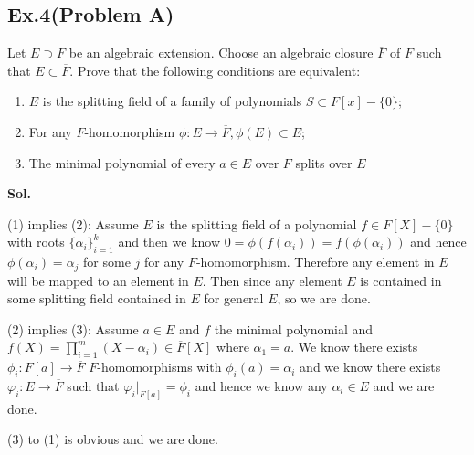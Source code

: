\documentclass[lang=en,11pt,a4paper,citestyle =authoryear]{elegantpaper}
\begin{document}
\subsection*{Ex.4(Problem A)}
Let $E\supset F$ be an algebraic extension. Choose an algebraic closure $\overline{F}$ of $F$ such that $E \subset \overline{F}$. Prove that the following conditions are equivalent:\par
\begin{enumerate}
    \item $E$ is the splitting field of a family of polynomials $S \subset F[x] - \{0\}$;
    \item For any $F$-homomorphism $\phi : E \to \overline{F} , \phi(E) \subset E$;
    \item The minimal polynomial of every $a \in E$ over $F$ splits over $E$ 
\end{enumerate}
\vspace{0.5em}
\textbf{Sol.} \par
\iffalse
1 $\Rightarrow$ 2: If $E$ is the splitting field of a family of polynomials $S\subset F[x]-\{0\}$, then any $\alpha\in E$ is a linear combination of roots of polynomials in $S\subset F[x]-\{0\}$. Therefore, any $F$-homomorphism fixing $F$ doesn't change $S$, which sends roots of polynomials to some roots of the same polynomials. Since $E$ is the splitting field, all these roots are in $E$, hence $\phi(E)\subset E$.

2 $\Rightarrow$ 3: For $a\in E$, the minimal polynomial over $F$, denoted by $m_{a, F}$ is irreducible. Since $a\in E$, we may regard $E$ as an extension of $F(a)$. Since $\phi$ sends $E$ to $E$, we know the conjugates of $a$, i.e. other roots of $m_{a,F}$, are in $E$ as well. Therefore, $m_{a,F}$ splits over $E$.

3 $\Rightarrow$ 1: Since for any $a\in E$, $m_{\alpha, F}$ splits over $F$, we may regard $E$ as the splitting field of $m_{a, F}$ for all $a\in E$.

We are done.
\fi
(1) implies (2): Assume $E$ is the splitting field of a polynomial $f\in F[X]-\{0\}$ with roots $\{\alpha_i\}_{i=1}^k$ and then we know $0 = \phi(f(\alpha_i)) = f(\phi(\alpha_i))$ and hence $\phi(\alpha_i) = \alpha_j$ for some $j$ for any $F$-homomorphism. Therefore any element in $E$ will be mapped to an element in $E$. Then since any element $E$ is contained in some splitting field contained in $E$ for general $E$, so we are done.\par
(2) implies (3): Assume $a\in E$ and $f$ the minimal polynomial and $f(X) = \prod_{i=1}^m (X-\alpha_i) \in \overline{F}[X]$ where $\alpha_1 = a$. We know there exists $\phi_i:F[a] \to\overline{F}$ $F$-homomorphisms with $\phi_i(a) = \alpha_i$ and we know there exists $\varphi_i:E\to \overline{F}$ such that $\varphi_i|_{F[a]} = \phi_i$ and hence we know any $\alpha_i \in E$ and we are done.\par
(3) to (1) is obvious and we are done.
\par 
\vspace{0.5em}
\end{document}
